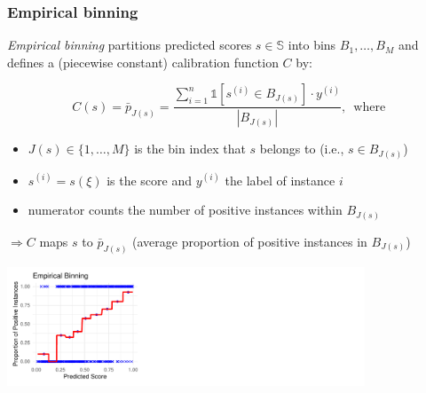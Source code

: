 \documentclass[11pt,compress,t,notes=noshow, xcolor=table]{beamer}
\begin{document}
\begin{frame}[t]
	\frametitle{Empirical binning}
\emph{Empirical binning} partitions predicted scores \( s \in \mathbb{S}\) into bins \( B_1, \ldots, B_M \) and defines a (piecewise constant) calibration function \( C \) by:

\[ 
C(s) = \bar{p}_{J(s)} = \frac{\sum_{i=1}^n \mathds{1}[ s^{(i)}  \in B_{J(s)}] \cdot y^{(i)}}{|B_{J(s)}|}, \, \text{ where }
\]

\begin{itemize}
    \item \( J(s) \in \{1, \dots, M\}\) is the bin index that \( s \) belongs to (i.e., \( s \in B_{J(s)} \))
    \item \( s^{(i)} = s(\xi) \) is the score  and \( y^{(i)} \) the label of instance \( i \) %
    \item numerator counts the number of positive instances within \( B_{J(s)} \)
\end{itemize}

\( \Rightarrow C \) maps \( s \) to \( \bar{p}_{J(s)} \) (average proportion of positive instances in \( B_{J(s)} \))  %

  \vfill
  \centering
\includegraphics[width=0.8\textwidth]{figure/calibration_methods1.pdf}
\end{frame}
\end{document}
